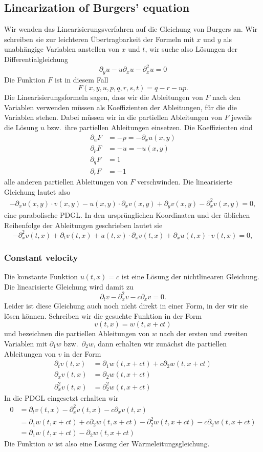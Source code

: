 \subsection{Linearization of Burgers' equation}
Wir wenden das Linearisierungsverfahren auf die Gleichung von Burgers an.
Wir schreiben sie zur leichteren Übertragbarkeit der Formeln
mit $x$ und $y$ als unabhängige Variablen anstellen von $x$ und $t$,
wir suche also Lösungen der Differentialgleichung
\[
\partial_yu-u\partial_xu-\partial_x^2u=0
\]
Die Funktion $F$ ist in diesem Fall
\[
F(x,y,u,p,q,r,s,t)=q-r-up.
\]
Die Linearisierungsformeln sagen, dass wir die Ableitungen von $F$ nach
den Variablen verwenden müssen als Koeffizienten der Ableitungen,
für die die Variablen stehen.  Dabei müssen wir in die partiellen Ableitungen
von $F$ jeweils die Lösung $u$ bzw.~ihre partiellen Ableitungen einsetzen.
Die Koeffizienten sind
\begin{align*}
\partial_uF&=-p=-\partial_xu(x,y)
\\
\partial_pF
&=-u=-u(x,y)
\\
\partial_qF
&=1
\\
\partial_rF
&=-1
\end{align*}
alle anderen partiellen Ableitungen von $F$ verschwinden. Die linearisierte
Gleichung lautet also
\begin{align*}
-\partial_xu(x,y)\cdot v(x,y)
-
u(x,y)\cdot\partial_xv(x,y)
+\partial_yv(x,y)
-\partial_x^2v(x,y)=0,
\end{align*}
eine parabolische PDGL. In den ursprünglichen Koordinaten und der
üblichen Reihenfolge der Ableitungen geschrieben
lautet sie
\[
-\partial_x^2v(t,x)
+\partial_tv(t,x)
+ u(t,x)\cdot\partial_xv(t,x)
+\partial_xu(t,x)\cdot v(t,x)
=0,
\]

\subsubsection{Constant velocity}
Die konstante Funktion $u(t,x)=c$ ist eine Lösung der nichtlinearen
Gleichung. Die linearisierte Gleichung wird damit zu
\[
\partial_tv
-\partial_x^2v
-c\partial_xv=0.
\]
Leider ist diese Gleichung auch noch nicht direkt in einer Form,
in der wir sie lösen können. Schreiben wir die gesuchte Funktion
in der Form
\[
v(t,x)=w(t,x+ct)
\]
und bezeichnen die partiellen Ableitungen von $w$ nach der ersten
und zweiten Variablen mit $\partial_1w$ bzw.~$\partial_2w$, dann
erhalten wir zunächst die partiellen Ableitungen von $v$
in der Form
\begin{align*}
\partial_t v(t,x)&=\partial_1w(t,x+ct)+c\partial_2w(t,x+ct)
\\
\partial_x v(t,x)&=\partial_2w(t,x+ct)
\\
\partial_x^2v(t,x)&=\partial_2^2w(t,x+ct)
\end{align*}
In die PDGL eingesetzt erhalten wir
\begin{align*}
0&=
\partial_t v(t,x)
-\partial_x^2v(t,x)
-c\partial_x v(t,x)
\\
&=
\partial_1w(t,x+ct)+c\partial_2w(t,x+ct)
-\partial_2^2w(t,x+ct)
-c\partial_2w(t,x+ct)
\\
&=\partial_1w(t,x+ct)-\partial_2w(t,x+ct)
\end{align*}
Die Funktion $w$ ist also eine Lösung der Wärmeleitungsgleichung.


